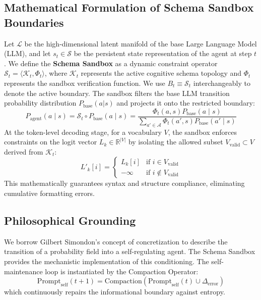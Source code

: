 \documentclass[10pt,journal,compsoc]{IEEEtran}
\begin{document}
\subsection{Mathematical Formulation of Schema Sandbox Boundaries}
Let $\mathcal{L}$ be the high-dimensional latent manifold of the base Large Language Model (LLM), and let $s_t \in \mathcal{S}$ be the persistent state representation of the agent at step $t$. We define the \textbf{Schema Sandbox} as a dynamic constraint operator $\mathcal{S}_t = \langle \mathcal{K}_t, \Phi_t \rangle$, where $\mathcal{K}_t$ represents the active cognitive schema topology and $\Phi_t$ represents the sandbox verification function. We use $B_t \equiv \mathcal{S}_t$ interchangeably to denote the active boundary. The sandbox filters the base LLM transition probability distribution $P_{\text{base}}(a|s)$ and projects it onto the restricted boundary:
\begin{equation}
P_{\text{agent}}(a \mid s) = \mathcal{S}_t \circ P_{\text{base}}(a \mid s) = \frac{\Phi_t(a, s) P_{\text{base}}(a \mid s)}{\sum_{a' \in \mathcal{A}} \Phi_t(a', s) P_{\text{base}}(a' \mid s)}
\end{equation}
At the token-level decoding stage, for a vocabulary $V$, the sandbox enforces constraints on the logit vector $L_k \in \mathbb{R}^{|V|}$ by isolating the allowed subset $V_{\text{valid}} \subset V$ derived from $\mathcal{K}_t$:
\begin{equation}
L'_k[i] = \begin{cases} L_k[i] & \text{if } i \in V_{\text{valid}} \\ -\infty & \text{if } i \notin V_{\text{valid}} \end{cases}
\end{equation}
This mathematically guarantees syntax and structure compliance, eliminating cumulative formatting errors.

\subsection{Philosophical Grounding}
We borrow Gilbert Simondon's concept of concretization to describe the transition of a probability field into a self-regulating agent. The Schema Sandbox provides the mechanistic implementation of this conditioning. The self-maintenance loop is instantiated by the Compaction Operator:
\begin{equation}
\text{Prompt}_{\text{self}}(t+1) = \text{Compaction}(\text{Prompt}_{\text{self}}(t) \cup \Delta_{\text{error}})
\end{equation}
which continuously repairs the informational boundary against entropy.
\end{document}
